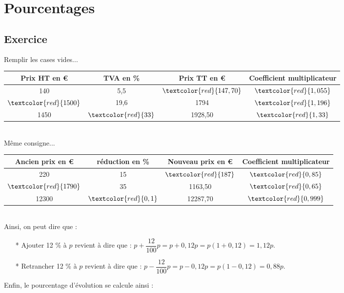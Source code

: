 \section{Pourcentages}

\subsection{Exercice }

Remplir les cases vides... \\

\begin{tabular}{c|c|c|c} 
Prix HT en € & TVA en \% & Prix TT en € & Coefficient multiplicateur \\
\hline
140 & 5,5 & $\textcolor{red}{147,70}$ & $\textcolor{red}{1,055}$ \\
$\textcolor{red}{1500}$& 19,6 & 1794 & $\textcolor{red}{ 1,196}$ \\
1450 & $\textcolor{red}{33}$ & 1928,50 & $\textcolor{red}{1,33}$ \\
\end{tabular} \\

Même consigne... \\

\begin{tabular}{c|c|c|c} 
Ancien prix en € & réduction en \% & Nouveau prix en € & Coefficient multiplicateur \\
\hline
220 & 15 & $\textcolor{red}{187}$ & $\textcolor{red}{0,85}$ \\
$\textcolor{red}{1790}$& 35 & 1163,50 & $\textcolor{red}{0,65}$ \\
12300 & $\textcolor{red}{0,1}$ & 12287,70 & $\textcolor{red}{0,999}$ \\
\end{tabular} \\

Ainsi, on peut dire que : 

\begin{enumerate}
\item[*] Ajouter 12 \% à $p$ revient à dire que : $ p + \dfrac{12}{100}p = p + 0,12p = p \left(1 + 0,12\right) = 1,12 p$.
\item[*] Retrancher 12 \% à $p$ revient à dire que : $ p - \dfrac{12}{100}p = p - 0,12p = p \left(1 - 0,12\right) = 0,88 p$.
\end{enumerate}

Enfin, le pourcentage d'évolution se calcule ainsi : \\

